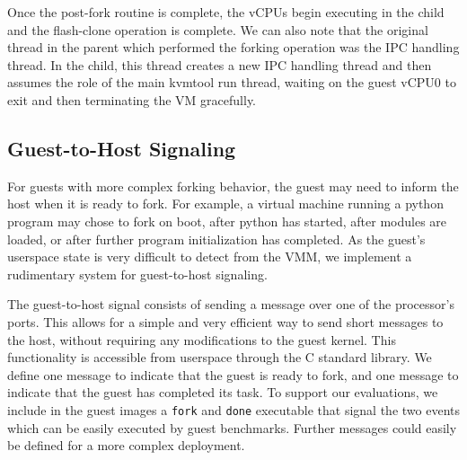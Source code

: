 Once the post-fork routine is complete, the vCPUs begin executing in the child
and the flash-clone operation is complete. We can also note that the original
thread in the parent which performed the forking operation was the IPC handling
thread. In the child, this thread creates a new IPC handling thread and then
assumes the role of the main kvmtool run thread, waiting on the guest vCPU0 to
exit and then terminating the VM gracefully.

\subsection{Guest-to-Host Signaling}

For guests with more complex forking behavior, the guest may need to inform the
host when it is ready to fork. For example, a virtual machine running a python
program may chose to fork on boot, after python has started, after modules are
loaded, or after further program initialization has completed. As the guest's
userspace state is very difficult to detect from the VMM, we implement a
rudimentary system for guest-to-host signaling.

The guest-to-host signal consists of sending a message over one of the
processor's ports. This allows for a simple and very efficient way to send
short messages to the host, without requiring any modifications to the guest
kernel. This functionality is accessible from userspace through the C standard
library. We define one message to indicate that the guest is ready to fork, and
one message to indicate that the guest has completed its task. To support our
evaluations, we include in the guest images a \texttt{fork} and \texttt{done}
executable that signal the two events which can be easily executed by guest
benchmarks. Further messages could easily be defined for a more complex
deployment.
